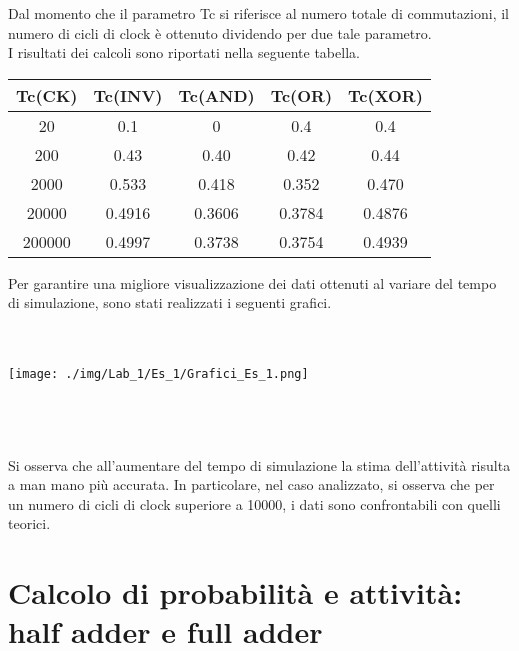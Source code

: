 \documentclass[10pt,  english, makeidx, a4paper, titlepage, oneside]{book}
\begin{document}
Dal momento che il parametro Tc si riferisce al numero totale di 
commutazioni, il numero di cicli di clock è ottenuto dividendo per due
tale parametro.
\\
I risultati dei calcoli sono riportati nella seguente tabella. 
\\
\begin{center}
	\begin{tabular}{|c|c|c|c|c|}
	\hline
	Tc(CK) & Tc(INV) & Tc(AND) & Tc(OR) & Tc(XOR) \\ 
	\hline
	20 & 0.1 & 0 & 0.4 & 0.4 \\
	\hline
	200 & 0.43 & 0.40 & 0.42 & 0.44 \\
	\hline
	2000 & 0.533 & 0.418 & 0.352 & 0.470 \\
	\hline
	20000 & 0.4916 & 0.3606 & 0.3784 & 0.4876 \\
	\hline
	200000 & 0.4997 & 0.3738 & 0.3754 & 0.4939 \\
	\hline
	\end{tabular}
\end{center}
\vspace{0.3cm}
Per garantire una migliore visualizzazione dei dati ottenuti 
al variare del tempo di simulazione, sono stati realizzati 
i seguenti grafici.
\\\\\\
\centerline{\texttt{[image: ./img/Lab\_1/Es\_1/Grafici\_Es\_1.png]}}
\\\\\\
Si osserva che all'aumentare del tempo di simulazione la stima 
dell'attività risulta a man mano più accurata. In particolare, 
nel caso analizzato, si osserva che per un numero di cicli di clock 
superiore a 10000, i dati sono confrontabili con quelli teorici.
\pagebreak

\section{Calcolo di probabilità e attività: half adder e full adder}
\end{document}
